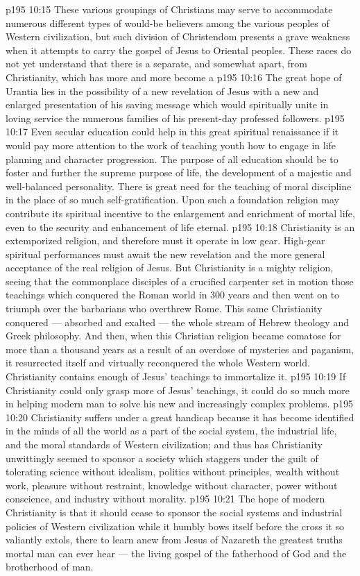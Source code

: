 \vs p195 10:15 These various groupings of Christians may serve to accommodate numerous different types of would\hyp{}be believers among the various peoples of Western civilization, but such division of Christendom presents a grave weakness when it attempts to carry the gospel of Jesus to Oriental peoples. These races do not yet understand that there is a  separate, and somewhat apart, from Christianity, which has more and more become a 
\vs p195 10:16 The great hope of Urantia lies in the possibility of a new revelation of Jesus with a new and enlarged presentation of his saving message which would spiritually unite in loving service the numerous families of his present\hyp{}day professed followers.
\vs p195 10:17 Even secular education could help in this great spiritual renaissance if it would pay more attention to the work of teaching youth how to engage in life planning and character progression. The purpose of all education should be to foster and further the supreme purpose of life, the development of a majestic and well\hyp{}balanced personality. There is great need for the teaching of moral discipline in the place of so much self\hyp{}gratification. Upon such a foundation religion may contribute its spiritual incentive to the enlargement and enrichment of mortal life, even to the security and enhancement of life eternal.
\vs p195 10:18 Christianity is an extemporized religion, and therefore must it operate in low gear. High\hyp{}gear spiritual performances must await the new revelation and the more general acceptance of the real religion of Jesus. But Christianity is a mighty religion, seeing that the commonplace disciples of a crucified carpenter set in motion those teachings which conquered the Roman world in 300 years and then went on to triumph over the barbarians who overthrew Rome. This same Christianity conquered --- absorbed and exalted --- the whole stream of Hebrew theology and Greek philosophy. And then, when this Christian religion became comatose for more than a thousand years as a result of an overdose of mysteries and paganism, it resurrected itself and virtually reconquered the whole Western world. Christianity contains enough of Jesus’ teachings to immortalize it.
\vs p195 10:19 If Christianity could only grasp more of Jesus’ teachings, it could do so much more in helping modern man to solve his new and increasingly complex problems.
\vs p195 10:20 Christianity suffers under a great handicap because it has become identified in the minds of all the world as a part of the social system, the industrial life, and the moral standards of Western civilization; and thus has Christianity unwittingly seemed to sponsor a society which staggers under the guilt of tolerating science without idealism, politics without principles, wealth without work, pleasure without restraint, knowledge without character, power without conscience, and industry without morality.
\vs p195 10:21 The hope of modern Christianity is that it should cease to sponsor the social systems and industrial policies of Western civilization while it humbly bows itself before the cross it so valiantly extols, there to learn anew from Jesus of Nazareth the greatest truths mortal man can ever hear --- the living gospel of the fatherhood of God and the brotherhood of man.
\quizlink
